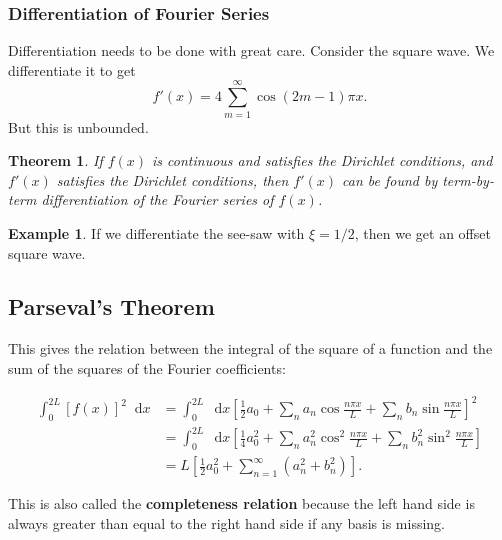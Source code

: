 \documentclass[12pt]{article}
\newcommand{\diff}{\mathop{}\!\mathrm{d}}
\newtheorem{theorem}{Theorem}[section]
\theoremstyle{definition}
\newtheorem{example}{Example}[section]
\theoremstyle{remark}
\begin{document}
\subsubsection{Differentiation of Fourier Series}%
\label{subsub:differentiation_of_fourier_series}

Differentiation needs to be done with great care. Consider the square wave. We differentiate it to get
\[
	f'(x) = 4 \sum_{m = 1}^{\infty} \cos (2m - 1) \pi x
.\]
But this is unbounded.

\begin{theorem}
	If $f(x)$ is continuous and satisfies the Dirichlet conditions, and $f'(x)$ satisfies the Dirichlet conditions, then $f'(x)$ can be found by term-by-term differentiation of the Fourier series of $f(x)$.
\end{theorem}

\begin{adjustbox}{minipage = \columnwidth - 25.5pt, margin=1em, frame=1pt, margin=0em}
\begin{example}
	If we differentiate the see-saw with $\xi = 1/2$, then we get an offset square wave.
\end{example}

\end{adjustbox}

\subsection{Parseval's Theorem}%
\label{sub:parseval_s_theorem}

This gives the relation between the integral of the square of a function and the sum of the squares of the Fourier coefficients:

\begin{align*}
	\int_{0}^{2L}[f(x)]^2\diff x &= \int_{0}^{2L}\diff x \left[ \frac{1}{2} a_0 + \sum_{n}a_n \cos \frac{n \pi x}{L} + \sum_{n}b_n \sin \frac{n \pi x}{L} \right]^2 \\
				   &= \int_{0}^{2L}\diff x \left[ \frac{1}{4} a_0^2 + \sum_{n} a_n^2 \cos^2 \frac{n \pi x}{L} + \sum_{n} b_n^2 \sin^2 \frac{n \pi x}{L} \right]\\
				   &= L \left[ \frac{1}{2} a_0^2 + \sum_{n = 1}^{\infty} (a_n^2 + b_n^2) \right].
\end{align*}

This is also called the \textbf{completeness relation} because the left hand side is always greater than equal to the right hand side if any basis is missing.
\end{document}
